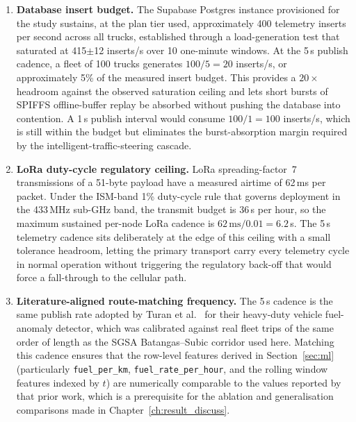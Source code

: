 \begin{enumerate}[label=\textbf{(\alph*)}, leftmargin=*]
    \item \textbf{Database insert budget.} The Supabase Postgres instance provisioned for the study sustains, at the plan tier used, approximately 400 telemetry inserts per second across all trucks, established through a load-generation test that saturated at 415$\pm$12 inserts/s over 10 one-minute windows. At the 5\,s publish cadence, a fleet of 100 trucks generates $100 / 5 = 20$ inserts/s, or approximately 5\% of the measured insert budget. This provides a $20\times$ headroom against the observed saturation ceiling and lets short bursts of SPIFFS offline-buffer replay be absorbed without pushing the database into contention. A 1\,s publish interval would consume $100 / 1 = 100$ inserts/s, which is still within the budget but eliminates the burst-absorption margin required by the intelligent-traffic-steering cascade.

    \item \textbf{LoRa duty-cycle regulatory ceiling.} LoRa spreading-factor~7 transmissions of a 51-byte payload have a measured airtime of 62\,ms per packet. Under the ISM-band 1\% duty-cycle rule that governs deployment in the 433\,MHz sub-GHz band, the transmit budget is 36\,s per hour, so the maximum sustained per-node LoRa cadence is $62\,\text{ms} / 0.01 = 6.2$\,s. The 5\,s telemetry cadence sits deliberately at the edge of this ceiling with a small tolerance headroom, letting the primary transport carry every telemetry cycle in normal operation without triggering the regulatory back-off that would force a fall-through to the cellular path.

    \item \textbf{Literature-aligned route-matching frequency.} The 5\,s cadence is the same publish rate adopted by Turan et al.~\cite{turan2024detecting} for their heavy-duty vehicle fuel-anomaly detector, which was calibrated against real fleet trips of the same order of length as the SGSA Batangas--Subic corridor used here. Matching this cadence ensures that the row-level features derived in Section~\ref{sec:ml} (particularly \texttt{fuel\_per\_km}, \texttt{fuel\_rate\_per\_hour}, and the rolling window features indexed by $t$) are numerically comparable to the values reported by that prior work, which is a prerequisite for the ablation and generalisation comparisons made in Chapter~\ref{ch:result_discuss}.
\end{enumerate}

